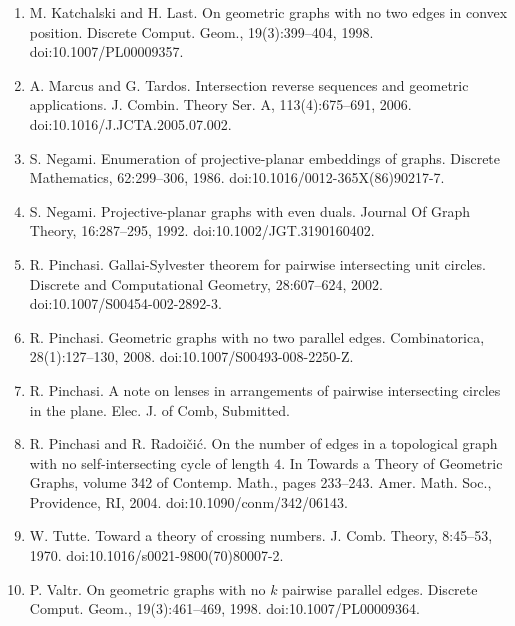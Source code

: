 \documentclass[10pt,a4paper]{amsart}
\begin{document}
\begin{enumerate}
\item[]  [12]  M. Katchalski and H. Last.  On geometric graphs with no two edges in convex position.  Discrete Comput. Geom., 19(3):399–404, 1998.  doi:10.1007/PL00009357.  
\item[]  [13]  A. Marcus and G. Tardos.  Intersection reverse sequences and geometric applications.  J. Combin. Theory Ser. A, 113(4):675–691, 2006.  doi:10.1016/J.JCTA.2005.07.002.  
\item[]  [14]  S. Negami.  Enumeration of projective-planar embeddings of graphs.  Discrete Mathematics, 62:299–306, 1986.  doi:10.1016/0012-365X(86)90217-7.  
\item[]  [15]  S. Negami.  Projective-planar graphs with even duals.  Journal Of Graph Theory, 16:287–295, 1992.  doi:10.1002/JGT.3190160402.  
\item[]  [16]  R. Pinchasi.  Gallai-Sylvester theorem for pairwise intersecting unit circles.  Discrete and Computational Geometry, 28:607–624, 2002.  doi:10.1007/S00454-002-2892-3.  
\item[]  [17]  R. Pinchasi.  Geometric graphs with no two parallel edges.  Combinatorica, 28(1):127–130, 2008.  doi:10.1007/S00493-008-2250-Z.  
\item[]  [18]  R. Pinchasi.  A note on lenses in arrangements of pairwise intersecting circles in the plane.  Elec. J. of Comb, Submitted.  
\item[]  [19]  R. Pinchasi and R. Radoičić.  On the number of edges in a topological graph with no self-intersecting cycle of length $4$.  In Towards a Theory of Geometric Graphs, volume 342 of Contemp. Math., pages 233–243. Amer. Math. Soc., Providence, RI, 2004.  doi:10.1090/conm/342/06143.  
\item[]  [20]  W. Tutte.  Toward a theory of crossing numbers.  J. Comb. Theory, 8:45–53, 1970.  doi:10.1016/s0021-9800(70)80007-2.  
\item[]  [21]  P. Valtr.  On geometric graphs with no $k$ pairwise parallel edges.  Discrete Comput. Geom., 19(3):461–469, 1998.  doi:10.1007/PL00009364.  
\end{enumerate}
\par
\end{document}
